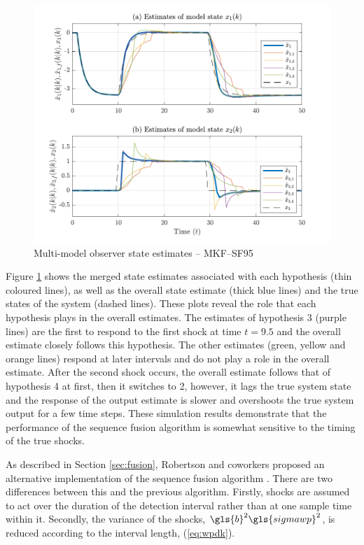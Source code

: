 \begin{figure}[htp]
	\centering
	\includegraphics[width=13cm]{images/rod_MKF_test_sim_MKF_SF95_x_est.pdf}
	\caption{Multi-model observer state estimates – MKF--SF95}
	\label{fig:rod-obs-sim-test-x_est-SF95}
\end{figure}
Figure \ref{fig:rod-obs-sim-test-x_est-SF95} shows the merged state estimates associated with each hypothesis (thin coloured lines), as well as the overall state estimate (thick blue lines) and the true states of the system (dashed lines). These plots reveal the role that each hypothesis plays in the overall estimates. The estimates of hypothesis 3 (purple lines) are the first to respond to the first shock at time $t=9.5$ and the overall estimate closely follows this hypothesis. The other estimates (green, yellow and orange lines) respond at later intervals and do not play a role in the overall estimate. After the second shock occurs, the overall estimate follows that of hypothesis 4 at first, then it switches to 2, however, it lags the true system state and the response of the output estimate is slower and overshoots the true system output for a few time steps. These simulation results demonstrate that the performance of the sequence fusion algorithm is somewhat sensitive to the timing of the true shocks.

As described in Section \ref{sec:fusion}, Robertson and coworkers proposed an alternative implementation of the sequence fusion algorithm \citep{robertson_method_1998}. There are two differences between this and the previous algorithm. Firstly, shocks are assumed to act over the duration of the detection interval rather than at one sample time within it. Secondly, the variance of the shocks, $\gls{b}^2\gls{sigmawp}^2$, is reduced according to the interval length, (\ref{eq:wpdk}).

